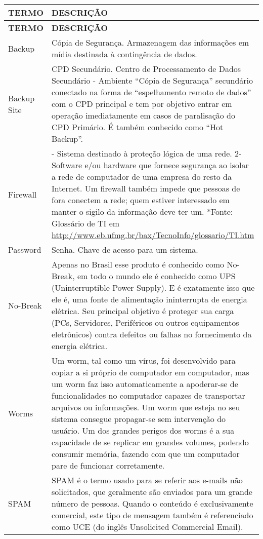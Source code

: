 \begin{longtable}{|>{\centering\arraybackslash}m{3cm}|>{\raggedright\arraybackslash}m{12cm}|}
\hline
\textbf{TERMO} & \textbf{DESCRIÇÃO} \\
\hline
\endfirsthead

\hline
\textbf{TERMO} & \textbf{DESCRIÇÃO} \\
\hline
\endhead

\hline
\endfoot

Backup & Cópia de Segurança. Armazenagem das informações em mídia destinada à contingência de dados. \\
\hline
Backup Site & CPD Secundário. Centro de Processamento de Dados Secundário - Ambiente “Cópia de Segurança” secundário conectado na forma de “espelhamento remoto de dados” com o CPD principal e tem por objetivo entrar em operação imediatamente em casos de paralisação do CPD Primário. É também conhecido como “Hot Backup”. \\
\hline
Firewall & 1- Sistema destinado à proteção lógica de uma rede. 2- Software e/ou hardware que fornece segurança ao isolar a rede de computador de uma empresa do resto da Internet. Um firewall também impede que pessoas de fora conectem a rede; quem estiver interessado em manter o sigilo da informação deve ter um.  
*Fonte: Glossário de TI em \url{http://www.eb.ufmg.br/bax/TecnoInfo/glossario/TI.htm} \\
\hline
Password & Senha. Chave de acesso para um sistema. \\
\hline
No-Break & Apenas no Brasil esse produto é conhecido como No-Break, em todo o mundo ele é conhecido como UPS (Uninterruptible Power Supply). E é exatamente isso que ele é, uma fonte de alimentação ininterrupta de energia elétrica. Seu principal objetivo é proteger sua carga (PCs, Servidores, Periféricos ou outros equipamentos eletrônicos) contra defeitos ou falhas no fornecimento da energia elétrica. \\
\hline
Worms & Um worm, tal como um vírus, foi desenvolvido para copiar a si próprio de computador em computador, mas um worm faz isso automaticamente a apoderar-se de funcionalidades no computador capazes de transportar arquivos ou informações. Um worm que esteja no seu sistema consegue propagar-se sem intervenção do usuário. Um dos grandes perigos dos worms é a sua capacidade de se replicar em grandes volumes, podendo consumir memória, fazendo com que um computador pare de funcionar corretamente. \\
\hline
SPAM & SPAM é o termo usado para se referir aos e-mails não solicitados, que geralmente são enviados para um grande número de pessoas. Quando o conteúdo é exclusivamente comercial, este tipo de mensagem também é referenciado como UCE (do inglês Unsolicited Commercial Email).  

\end{longtable}
